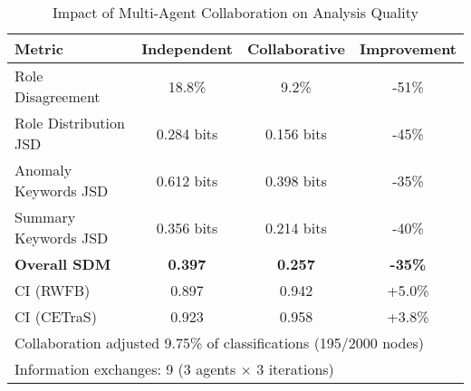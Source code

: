 \begin{table}[!t]
\centering
\caption{Impact of Multi-Agent Collaboration on Analysis Quality}
\label{tab:collaboration-impact}
\small
\begin{tabular}{l c c c}
\toprule
\textbf{Metric} & \textbf{Independent} & \textbf{Collaborative} & \textbf{Improvement} \\
\midrule
Role Disagreement & 18.8\% & 9.2\% & -51\% \\
Role Distribution JSD & 0.284 bits & 0.156 bits & -45\% \\
Anomaly Keywords JSD & 0.612 bits & 0.398 bits & -35\% \\
Summary Keywords JSD & 0.356 bits & 0.214 bits & -40\% \\
\textbf{Overall SDM} & \textbf{0.397} & \textbf{0.257} & \textbf{-35\%} \\
\midrule
CI (RWFB) & 0.897 & 0.942 & +5.0\% \\
CI (CETraS) & 0.923 & 0.958 & +3.8\% \\
\midrule
\multicolumn{4}{l}{\footnotesize Collaboration adjusted 9.75\% of classifications (195/2000 nodes)} \\
\multicolumn{4}{l}{\footnotesize Information exchanges: 9 (3 agents $\times$ 3 iterations)} \\
\bottomrule
\end{tabular}
\end{table}